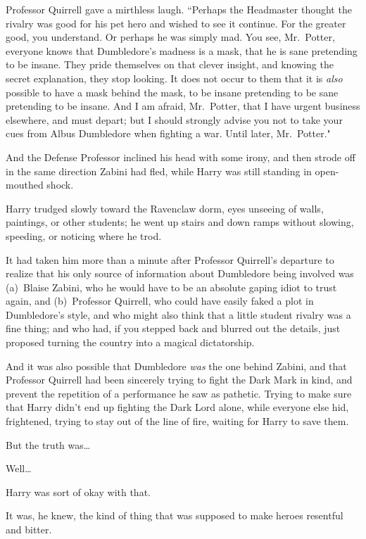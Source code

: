 Professor Quirrell gave a mirthless laugh. ``Perhaps the Headmaster thought the rivalry was good for his pet hero and wished to see it continue. For the greater good, you understand. Or perhaps he was simply mad. You see, Mr.~Potter, everyone knows that Dumbledore's madness is a mask, that he is sane pretending to be insane. They pride themselves on that clever insight, and knowing the secret explanation, they stop looking. It does not occur to them that it is \emph{also} possible to have a mask behind the mask, to be insane pretending to be sane pretending to be insane. And I am afraid, Mr.~Potter, that I have urgent business elsewhere, and must depart; but I should strongly advise you not to take your cues from Albus Dumbledore when fighting a war. Until later, Mr.~Potter."

And the Defense Professor inclined his head with some irony, and then strode off in the same direction Zabini had fled, while Harry was still standing in open-mouthed shock.


Harry trudged slowly toward the Ravenclaw dorm, eyes unseeing of walls, paintings, or other students; he went up stairs and down ramps without slowing, speeding, or noticing where he trod.

It had taken him more than a minute after Professor Quirrell's departure to realize that his only source of information about Dumbledore being involved was (a)~Blaise Zabini, who he would have to be an absolute gaping idiot to trust again, and (b)~Professor Quirrell, who could have easily faked a plot in Dumbledore's style, and who might also think that a little student rivalry was a fine thing; and who had, if you stepped back and blurred out the details, just proposed turning the country into a magical dictatorship.

And it was also possible that Dumbledore \emph{was} the one behind Zabini, and that Professor Quirrell had been sincerely trying to fight the Dark Mark in kind, and prevent the repetition of a performance he saw as pathetic. Trying to make sure that Harry didn't end up fighting the Dark Lord alone, while everyone else hid, frightened, trying to stay out of the line of fire, waiting for Harry to save them.

But the truth was{\ldots}

Well{\ldots}

Harry was sort of okay with that.

It was, he knew, the kind of thing that was supposed to make heroes resentful and bitter.

